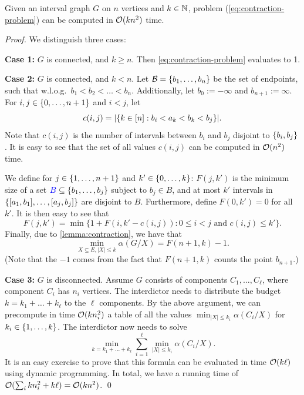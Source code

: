 \begin{theorem}
\label{thm:contraction-blocker}
Given an interval graph $G$ on $n$ vertices and $k \in \mathbb{N}$, problem (\ref{eq:contraction-problem}) can be computed in $\mathcal{O}(kn^2)$ time.
\end{theorem}
\begin{proof}
We distinguish three cases:

\textbf{Case 1:} $G$ is connected, and $k \geq n$. Then \cref{eq:contraction-problem} evaluates to 1.

\textbf{Case 2:} $G$ is connected, and $k < n$. Let $\mathcal{B} = \{ b_1, \ldots, b_n \}$ be the set of endpoints, such that w.l.o.g.\ $b_1 < b_2 < \dots < b_n$. Additionally, let $b_0 := -\infty$ and $b_{n+1} := \infty$. For $i,j \in \{ 0, \ldots, n+1 \}$ and $i < j$, let 
\[c(i, j) = |\{ k \in [n] : b_i < a_k < b_k < b_j \}|. \]
Note that $c(i, j)$ is the number of intervals between $b_i$ and $b_j$ disjoint to $\{ b_i, b_j \}$. It is easy to see that the set of all values $c(i,j)$ can be computed in $\mathcal{O}(n^2)$ time.


We define for $j \in \{ 1, \ldots, n+1 \}$ and $k' \in \{ 0, \ldots, k \}$:
$F(j, k')$ is the minimum size of a set $\textcolor{blue}{B} \subseteq \{ b_1, \ldots, b_j \}$ subject to $b_j \in B$, and at most $k'$ intervals in $\{ [a_1,b_1], \ldots, [a_j, b_j] \}$ are disjoint to $B$. Furthermore, define $F(0, k') = 0$ for all $k'$. It is then easy to see that 
\begin{equation}
F(j,k') = \min \{ 1 + F(i, k'-c(i,j)) \colon 0 \leq i < j\text{ and } c(i,j) \leq k' \}.
\end{equation}  
Finally, due to \cref{lemma:contraction}, we have that 
\[\min_{X \subseteq E, |X| \leq k}\alpha(G/X) = F(n+1, k) - 1. \]
(Note that the $-1$ comes from the fact that $F(n+1, k)$ counts the point $b_{n+1}$.)

\textbf{Case 3:} $G$ is disconnected. Assume $G$ consists of  components $C_1, \dots, C_{\ell}$, where component $C_i$ has $n_i$ vertices. The interdictor needs to distribute the budget $k = k_1 + \dots + k_{\ell}$ to the $\ell$ components. By the above argument, we can precompute in time $\mathcal{O}(kn_i^2)$ a table of all the values $\min_{|X| \leq k_i} \alpha(C_i/X)$ for $k_i \in \{ 1, \ldots, k \}$. The interdictor now needs to solve 
\[ \min_{k = k_1 + \dots + k_{\ell}} \sum_{i=1}^{\ell} \min_{|X| \leq k_i} \alpha(C_i/X). \]
It is an easy exercise to prove that this formula can be evaluated in time $\mathcal{O}(k\ell)$ using dynamic programming. In total, we have a running time of $\mathcal{O}(\sum_i kn_i^2 + k\ell) = \mathcal{O}(kn^2)$. \qed
\end{proof}

